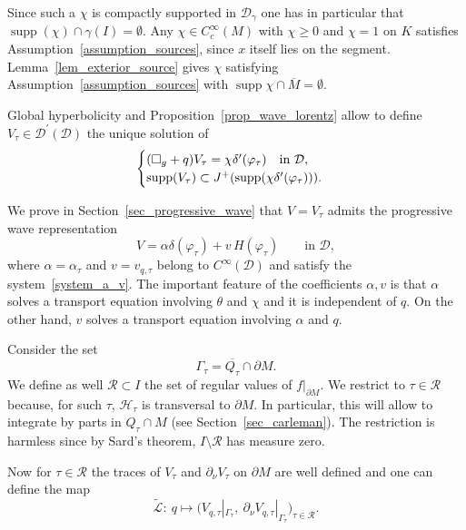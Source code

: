\documentclass[12pt,reqno]{amsart}
\numberwithin{equation}{section}
\newcommand{\bg}{\Box_{g}}
\theoremstyle{definition}
\theoremstyle{plain}
\theoremstyle{definition}
\theoremstyle{definition}
\newcommand{\U}{\uu}
\renewcommand{\U}{\uu}
\newcommand{\D}{\mathcal{D}}
\newcommand{\dg}{\D_\gamma}
\newcommand{\uu}{M}
\DeclareMathOperator{\supp}{supp}
\begin{document}
Since such a  $\chi$ is compactly supported in $\dg$ one has in particular that $\supp(\chi)\cap\gamma(I)=\emptyset$. Any $\chi\in C^\infty_c(\U)$ with $\chi \geq 0$ and $\chi=1$ on $K$ satisfies Assumption~\ref{assumption_sources}, since $x$ itself lies on the segment. Lemma~\ref{lem_exterior_source} gives $\chi$ satisfying Assumption~\ref{assumption_sources} with $\supp\chi\cap\overline\uu=\emptyset$.

Global hyperbolicity and Proposition~\ref{prop_wave_lorentz} allow to define $V_{\tau} \in \D^\prime(\D)$ the unique solution of
\begin{equation}
 \label{eq_wave_lorentz}
\begin{cases}
    (\bg+q) V_{\tau}=\chi \delta^\prime(\varphi_\tau)  \quad \textnormal{in } \D,\\
    \supp (V_{\tau}) \subset J^+(\supp (\chi \delta^\prime(\varphi_\tau))).
    \end{cases}
\end{equation}

We prove in Section~\ref{sec_progressive_wave} that $V=V_\tau$ admits the progressive wave representation
\begin{equation}\label{eq_progressive_decomposition}
V=\alpha\delta(\varphi_\tau)+v\,H(\varphi_\tau)\qquad\text{in }\D,
\end{equation}
where $\alpha=\alpha_\tau$ and $v=v_{q,\tau}$ belong to $C^\infty(\D)$ and satisfy the system~\eqref{system_a_v}. The important feature of the coefficients $\alpha,v $  is that $\alpha$ solves a transport equation involving $\theta$ and $\chi$ and it is independent of $q$. On the other hand, $v$ solves a transport equation involving $\alpha$ and $q$.

Consider the set
\begin{equation}
\Gamma_\tau=\overline{Q_\tau}\cap\partial\uu.
\end{equation}
We define as well $\mathcal R\subset I$ the set of regular values of $f|_{\partial\uu}$. We restrict to $\tau\in\mathcal R$ because, for such $\tau$, $\mathcal H_\tau$ is transversal to $\partial\uu$. In particular, this will allow to integrate by parts in $Q_\tau\cap\uu$ (see Section~\ref{sec_carleman}). The restriction is harmless since by Sard's theorem, $I\setminus\mathcal R$ has measure zero.

Now for $\tau \in \mathcal R$ the traces of $V_\tau$ and $\partial_\nu V_\tau$ on $\partial\uu$ are well defined \cite[Theorem~8.2.4 and Corollary~8.2.7]{hormander1990} and one can define the map
\begin{equation}\label{eq_data_V}
\tilde{\mathcal L}:\ q\longmapsto\bigl(V_{q,\tau}|_{\Gamma_\tau},\ \partial_\nu V_{q,\tau}|_{\Gamma_\tau}\bigr)_{\tau\in\mathcal R}.
\end{equation}
\end{document}
